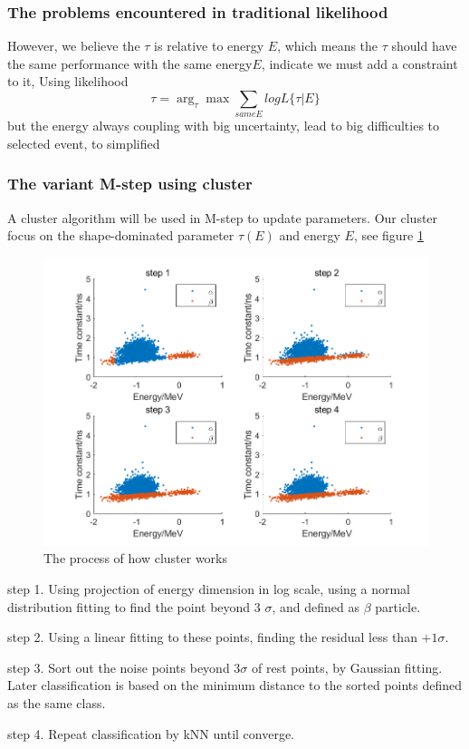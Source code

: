 \documentclass{article}
\begin{document}
\subsubsection{The problems encountered in traditional likelihood}
\par However, we believe the $\tau$ is relative to energy $E$, which means the $\tau$ should have the same performance with the same energy$E$, indicate we must add a constraint to it, Using likelihood 
$$ \tau = \arg_\tau\max\sum_{same E}log L{\{\tau|E\}} $$
but the energy always coupling with big uncertainty, lead to big difficulties to selected event, to simplified

\subsubsection{The variant M-step using cluster}
\par A cluster algorithm will be used in M-step to update parameters. Our cluster focus on the shape-dominated parameter $\tau(E)$ and energy $E$, see figure \ref{fig:2}

	\begin{figure}[h]
	\centering\includegraphics[width=5 in]{figure1.png}
	\caption{The process of how cluster works }
	\label{fig:2}
	\end{figure}
	
	\par step 1. Using projection of energy dimension in log scale, using a normal distribution fitting to find the point beyond 3 $\sigma$, and defined as $\beta$ particle.
	\par step 2. Using a linear fitting to these points, finding the residual less than $+1 \sigma$. 
	\par step 3. Sort out the noise points beyond $3\sigma$ of rest points, by Gaussian fitting. Later classification is based on the minimum distance to the sorted points defined as the same class. 
	\par step 4. Repeat classification by kNN until converge.
	
\end{document}
